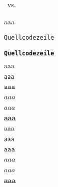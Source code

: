 \documentclass[ngerman,
cdfont=normalbold,
cdfont=heavy,
cdfont=ultrabold,
]{tudscrreprt}
\begin{document}
\meaning\mddefault
\meaning\bfdefault

\begingroup
\makeatletter

\meaning\tud@cdfont@md
\meaning\tud@cdfont@bf

\meaning\tud@cdmath@enc~vs. \encodingdefault
\endgroup

aaa

\blindtext

\ttdefault \familydefault

%
%
%
\texttt{\blindtext}
%
%
%
%
%

\makeatletter

%

\makeatother

\begingroup
\let\protect\meaning\ttfamily 
\endgroup
\texttt{Quellcodezeile}

\texttt{\bfseries Quellcodezeile \bfdefault}

$\mathrm{aaa}$

$\mathsf{aaa}$

$\mathtt{aaa}$

$\mathnormal{aaa}$

$\mathit{aaa}$

$\mathbf{aaa}$

{
\boldmath
$\mathrm{aaa}$

$\mathsf{aaa}$

$\mathtt{aaa}$

$\mathnormal{aaa}$

$\mathit{aaa}$

$\mathbf{aaa}$
}


\blinddocument



\blindtext\clearpage

\blindmathpaper
\end{document}
